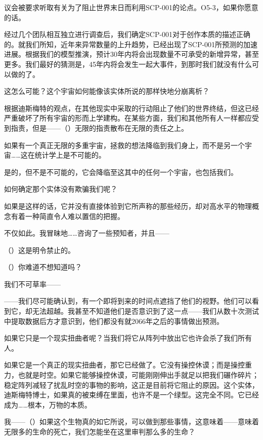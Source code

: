 \begin{greenrecordbox}

议会被要求听取有关为了阻止世界末日而利用SCP-001的论点。O5-3，如果你愿意的话。

经过几个团队相互独立进行调查后，我们确定SCP-001对于创作本质的描述正确的。就我们所知，近年来异常数量的上升趋势，已经出现了SCP-001所预测的加速进展。根据我们的模型推演，预计30年内将会出现数量不可承受的新增异常，甚至更多。我们最好的猜测是，45年内将会发生一起大事件，到那时我们就没有什么可以做的了。

这怎么可能？这个宇宙如何能像该实体所说的那样快地分崩离析？

根据迪斯梅特的观点，在其他现实中采取的行动阻止了他们的世界终结，但这已经严重破坏了所有宇宙的形而上学建构。在某些方面，我们和其他所有人一样都应受到指责，但是——（）无限的指责散布在无限的责任之上。

如果有一个真正无限的多重宇宙，拯救的想法降临到我们身上，而不是另一个宇宙……这在统计学上是不可能的。

是的，但不是不可能的，它会降临至这其中的任何一个宇宙，也包括我们。

如何确定那个实体没有欺骗我们呢？

如果是这样的话，它并没有直接体验到它所声称的那些经历，却对高水平的物理概念有着一种简直令人难以置信的把握。

不仅如此。我冒昧地……咨询了一些预知者，并且——

（）这是明令禁止的。

（）你难道不想知道吗？

我们不可草率——

——我们尽可能确认到，有一个即将到来的时间点遮挡了他们的视野。他们可以看到它，却无法超越。我甚至不知道他们是否意识到了这一点——我们从数十次测试中提取数据后方才意识到，他们都没有就2066年之后的事情做出预测。

如果它只是一个现实扭曲者呢？当我们将它从阵列中放出它也许会杀了我们所有人。

如果它是一个真正的现实扭曲者，那它已经做了。它没有操控休谟；而是操控重力，也就是时空。如果它能够操控休谟，可能刚刚伸出手就足以把我们碾作碎片；稳定阵列减轻了扰乱时空的事物的影响，这正是目前将它阻止的原因。这个实体，迪斯梅特博士，如果真的被束缚在里面，也许不是一个绿型。这完全不同。它已经成为……根本，万物的本质。

我——（）如果这个生物真的如它所说，可以做到那些事情，这意味着——意味着无限多的生命的死亡，我们怎能坐在这里审判那么多的生命？


\end{greenrecordbox}
